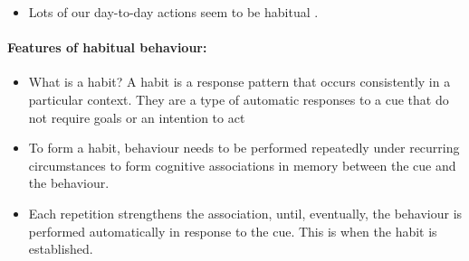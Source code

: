 \documentclass[a4paper, 11pt]{report}
\begin{document}
\begin{itemize}
	\item Lots of our day-to-day actions seem to be habitual \citep{wood2002habits}.
\end{itemize}

\paragraph{Features of habitual behaviour:}

\begin{itemize}
	\item What is a habit? A habit is a response pattern that occurs consistently in a particular context. They are a type of automatic responses to a cue that do not require goals or an intention to act \citep{wood2007new, gardner2015review}

	\item To form a habit, behaviour needs to be performed repeatedly under recurring circumstances to form cognitive associations in memory between the cue and the behaviour.

	\item Each repetition strengthens the association, until, eventually, the behaviour is performed automatically in response to the cue. This is when the habit is established.
\end{itemize}
\end{document}
